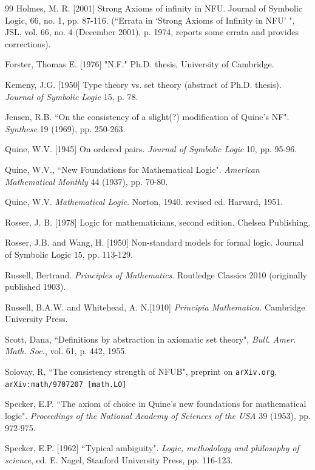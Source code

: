 \documentclass{article}
\theoremstyle{definition}
\theoremstyle{remark}
\begin{document}
{\begin{thebibliography}{99}
   Holmes, M. R. [2001]
Strong Axioms of infinity in NFU.
Journal of Symbolic Logic, 66, no. 1, pp. 87-116.  \newline(``Errata in `Strong
Axioms of Infinity in NFU' ", JSL, vol. 66, no. 4 (December
2001), p. 1974, reports some errata and provides corrections).

  Forster, Thomas E. [1976]
"N.F."
Ph.D. thesis, University of Cambridge.

  Kemeny, J.G. [1950]
Type theory vs. set theory (abstract of Ph.D. thesis).
{\em Journal of Symbolic Logic\/} 15, p. 78.

  Jensen, R.B.
``On the consistency of a slight(?) modification of Quine's NF".
{\em Synthese\/} 19 (1969), pp. 250-263.

  Quine, W.V. [1945]
On ordered pairs.
{\em Journal of Symbolic Logic\/} 10, pp. 95-96.

  Quine, W.V.,
``New Foundations for Mathematical Logic".
{\em American Mathematical Monthly\/} 44 (1937), pp. 70-80.

  Quine, W.V.  {\em Mathematical Logic\/}.  Norton, 1940.  revised ed. Harvard, 1951.

  Rosser, J. B. [1978]
Logic for mathematicians, second edition.
Chelsea Publishing.

  Rosser, J.B. and Wang, H. [1950]
Non-standard models for formal logic.
Journal of Symbolic Logic 15, pp. 113-129.

  Russell, Bertrand.  {\em Principles of Mathematics\/}.  Routledge Classics 2010 (originally published 1903).

  Russell, B.A.W. and Whitehead, A. N.[1910]
{\em Principia Mathematica.\/} Cambridge University Press.

  Scott, Dana, ``Definitions by abstraction in axiomatic set theory",  {\em Bull. Amer. Math.
Soc.}, vol. 61, p. 442, 1955.

  Solovay, R, ``The consistency strength of NFUB",  preprint on {\tt arXiv.org}, {\tt arXiv:math/9707207 [math.LO]}

  Specker, E.P.
``The axiom of choice in Quine's new foundations for mathematical logic".
{\em Proceedings of the National Academy of Sciences of the USA\/} 39 (1953), pp. 972-975.

  Specker, E.P. [1962]
``Typical ambiguity".
{\em Logic, methodology and philosophy of science\/}, ed. E. Nagel, Stanford University Press, pp. 116-123.


\end{thebibliography}}
\end{document}
